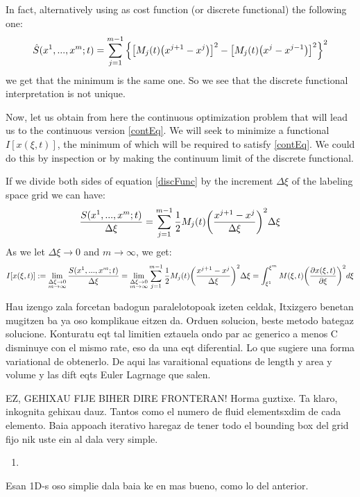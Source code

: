 \documentclass[11pt, a4paper]{article} %
\begin{document}
In fact, alternatively using as cost function (or discrete functional) the following one:
\begin{equation}
\hat{S}(x^1,...,x^m;t)=\sum_{j=1}^{m-1} \qty{\qty[ M_j(t) \qty(x^{j+1}-x^j)]^2-\qty[ M_j(t) \qty(x^{j}-x^{j-1})]^2}^2
\end{equation}
we get that the minimum is the same one. So we see that the discrete functional interpretation is not unique.

Now, let us obtain from here the continuous optimization problem that will lead us to the continuous version \eqref{contEq}. We will seek to minimize a functional $I[x(\xi,t)]$, the minimum of which will be required to satisfy \eqref{contEq}. We could do this by inspection or by making the continuum limit of the discrete functional.

If we divide both sides of equation \eqref{discFunc} by the increment $\Delta \xi$ of the labeling space grid we can have:
\begin{equation}
\frac{S( x^1,...,x^m;t)}{\Delta\xi}=\sum_{j=1}^{m-1} \frac{1}{2} M_j(t) \qty(\frac{x^{j+1}-x^j}{\Delta \xi})^2 \Delta \xi
\end{equation}
As we let $\Delta \xi \rightarrow 0$ and $m\rightarrow \infty$, we get:
\begin{equation}
I[x(\xi,t)]:=\lim\limits_{\substack{\Delta \xi \rightarrow 0\\ m \rightarrow \infty}}\frac{S( x^1,...,x^m;t)}{\Delta\xi}=\lim\limits_{\substack{\Delta \xi \rightarrow 0\\ m \rightarrow \infty}} \sum_{j=1}^{m-1}\frac{1}{2} M_j(t) \qty(\frac{x^{j+1}-x^j}{\Delta \xi})^2 \Delta \xi=\int_{\xi^1}^{\xi^m} M(\xi,t) \qty(\pdv{x(\xi,t)}{\xi})^2d\xi
\end{equation}



Hau izengo zala forcetan badogun paralelotopoak izeten celdak, Itxizgero benetan mugitzen ba ya oso komplikaue eitzen da. Orduen solucion, beste metodo bategaz solucione. Konturatu eqt tal limitien eztauela ondo par ac generico a menos C disminuye con el mismo rate, eso da una eqt diferential. Lo que sugiere una forma variational de obtenerlo.
De aqui las varaitional equations de length y area y volume y las dift eqts Euler Lagrnage que salen.





EZ, GEHIXAU FIJE BIHER DIRE FRONTERAN! Horma guztixe. Ta klaro, inkognita gehixau dauz. Tantos como el numero de fluid elementsxdim de cada elemento. Baia appoach iterativo haregaz de tener todo el bounding box del grid fijo nik uste ein al dala very simple.
\begin{enumerate}
\item 
\end{enumerate}
Esan 1D-s oso simplie dala baia ke en mas bueno, como lo del anterior.
\end{document}
